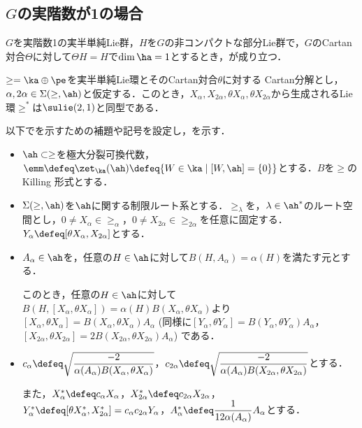\subsection{$ G$の実階数が1の場合}

\begin{thm}\label{thm:1216-main}
  $G$を実階数1の実半単純Lie群，$H$を$G$の非コンパクトな部分Lie群で，$G$のCartan対合$\Theta$に対して$\Theta H = H$で$\dim \ha = 1$とするとき，が成り立つ．
\end{thm}

\begin{thm}\label{thm:0810}\cite[p.~409, Theorem~3.1]{hel01}

  $\ge = \ka \oplus \pe$を実半単純Lie環とそのCartan対合$\theta$に対する Cartan分解とし，$\alpha,2\alpha\in \Sigma(\ge,\ah) $と仮定する．このとき，$X_{\alpha},X_{2\alpha}, \theta X_{\alpha}, \theta X_{2\alpha} $から生成されるLie環$\ge^{*} $は$\sulie(2,1)$と同型である．
  
\end{thm}
以下でを示すための補題や記号を設定し，を示す．
\begin{nttdef}
  \leavevmode
  \vspace{-1em}
  \begin{itemize}
  \item $\ah \subset \ge$を極大分裂可換代数，$\emm \defeq \zet_{\ka}(\ah) \defeq \{W\in \ka\mid [W,\ah] = \{0\} \} $とする．$B$を$\ge$のKilling 形式とする．
  \item $\Sigma(\ge,\ah) $を$\ah$に関する制限ルート系とする．$\ge_{\lambda} $を，$\lambda\in \ah^{*}$のルート空間とし，$0\neq X_{\alpha}\in \ge_{\alpha} $，$0\neq X_{2\alpha}\in \ge_{2\alpha} $を任意に固定する．$Y_{\alpha}\defeq [\theta X_{\alpha}, X_{2\alpha}] $とする．
  \item $A_{\alpha}\in \ah $を，任意の$H\in \ah$に対して$B(H,A_{\alpha}) = \alpha(H) $を満たす元とする．
    
    このとき，任意の$H\in \ah$に対して$B(H, [X_{\alpha}, \theta X_{\alpha}]) = \alpha(H) B(X_{\alpha}, \theta X_{\alpha}) $より$[X_{\alpha}, \theta X_{\alpha}] = B(X_{\alpha}, \theta X_{\alpha})A_{\alpha} $ (同様に$[Y_{\alpha}, \theta Y_{\alpha}]  = B(Y_{\alpha}, \theta Y_{\alpha})A_{\alpha} $，$ [X_{2\alpha}, \theta X_{2\alpha}] = 2B(X_{2\alpha}, \theta X_{2\alpha})A_{\alpha} $) である．
    \item $c_{\alpha}\defeq \sqrt{\dfrac{-2}{\alpha(A_{\alpha})B(X_{\alpha}, \theta X_{\alpha})}} $，$ c_{2\alpha}  \defeq \sqrt{\dfrac{-2}{\alpha(A_{\alpha})B(X_{2\alpha}, \theta X_{2\alpha})}} $とする．

    また，$X_{\alpha}^{*}\defeq c_{\alpha}X_{\alpha} $，$X_{2\alpha}^{*}\defeq c_{2\alpha}X_{2\alpha} $，$Y_{\alpha}^{*} \defeq [\theta X_{\alpha}^{*}, X_{2\alpha}^{*} ] = c_{\alpha}c_{2\alpha}Y_{\alpha} $，$A_{\alpha}^{*}\defeq \dfrac{1}{12\alpha(A_{\alpha}) %
    }A_{\alpha} $とする．
  \end{itemize}
\end{nttdef}

